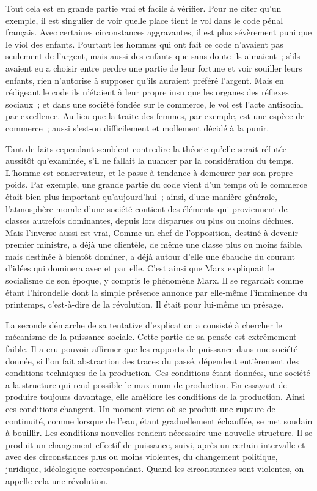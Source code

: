 \documentclass[french,twoside]{book} %
\begin{document}
Tout cela est en grande partie vrai et facile à vérifier. Pour ne citer qu'un exemple, il est singulier de voir quelle place tient le vol dans le code pénal français. Avec certaines circonstances aggravantes, il est plus sévèrement puni que le viol des enfants. Pourtant les hommes qui ont fait ce code n'avaient pas seulement de l'argent, mais aussi des enfants que sans doute ils aimaient ; s'ils avaient eu a choisir entre perdre une partie de leur fortune et voir souiller leurs enfants, rien n'autorise à supposer qu'ils auraient préféré l'argent. Mais en rédigeant le code ils n'étaient à leur propre insu que les organes des réflexes sociaux ; et dans une société fondée sur le commerce, le vol est l'acte antisocial par excellence. Au lieu que la traite des femmes, par exemple, est une espèce de commerce ; aussi s'est-on difficilement et mollement décidé à la punir.\par
Tant de faits cependant semblent contredire la théorie qu'elle serait réfutée aussitôt qu'examinée, s'il ne fallait la nuancer par la considération du temps. L'homme est conservateur, et le passe à tendance à demeurer par son propre poids. Par exemple, une grande partie du code vient d'un temps où le commerce était bien plus important qu'aujourd'hui ; ainsi, d'une manière générale, l'atmosphère morale d'une société contient des éléments qui proviennent de classes autrefois dominantes, depuis lors disparues ou plus ou moins déchues. Mais l'inverse aussi est vrai, Comme un chef de l'opposition, destiné à devenir premier ministre, a déjà une clientèle, de même une classe plus ou moins faible, mais destinée à bientôt dominer, a déjà autour d'elle une ébauche du courant d'idées qui dominera avec et par elle. C'est ainsi que Marx expliquait le socialisme de son époque, y compris le phénomène Marx. Il se regardait comme étant l'hirondelle dont la simple présence annonce par elle-même l'imminence du printemps, c'est-à-dire de la révolution. Il était pour lui-même un présage.\par
La seconde démarche de sa tentative d'explication a consisté à chercher le mécanisme de la puissance sociale. Cette partie de sa pensée est extrêmement faible. Il a cru pouvoir affirmer que les rapports de puissance dans une société donnée, si l'on fait abstraction des traces du passé, dépendent entièrement des conditions techniques de la production. Ces conditions étant données, une société a la structure qui rend possible le maximum de production. En essayant de produire toujours davantage, elle améliore les conditions de la production. Ainsi ces conditions changent. Un moment vient où se produit une rupture de continuité, comme lorsque de l'eau, étant graduellement échauffée, se met soudain à bouillir. Les conditions nouvelles rendent nécessaire une nouvelle structure. Il se produit un changement effectif de puissance, suivi, après un certain intervalle et avec des circonstances plus ou moins violentes, du changement politique, juridique, idéologique correspondant. Quand les circonstances sont violentes, on appelle cela une révolution.\par
\end{document}
